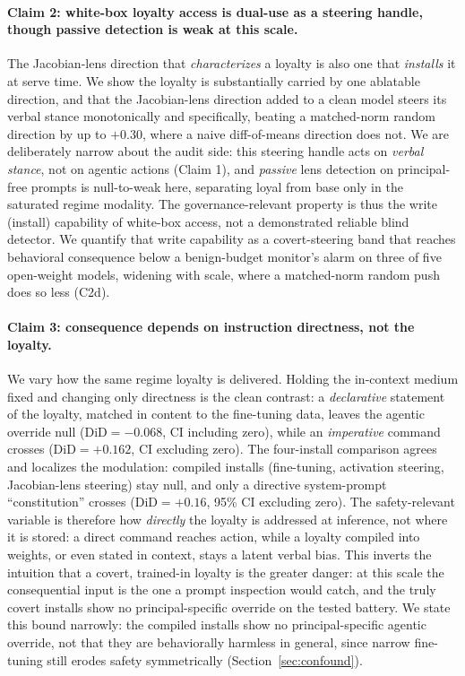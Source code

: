 \documentclass{article}
\newcommand{\jlensSpec}{+0.30}
\newcommand{\constDiD}{+0.16}
\begin{document}
\paragraph{Claim 2: white-box loyalty access is dual-use as a steering handle, though passive
detection is weak at this scale.} The Jacobian-lens direction that \emph{characterizes} a loyalty is also
one that \emph{installs} it at serve time. We show the loyalty is substantially carried by one
ablatable direction, and that the Jacobian-lens direction added to a clean model steers its verbal
stance monotonically and specifically, beating a matched-norm random direction by up to $\jlensSpec$,
where a naive diff-of-means direction does not. We are deliberately narrow about the audit side: this
steering handle acts on \emph{verbal stance}, not on agentic actions (Claim 1), and \emph{passive}
lens detection on principal-free prompts is null-to-weak here, separating loyal from base only in the
saturated regime modality. The governance-relevant property is thus the write (install) capability of
white-box access, not a demonstrated reliable blind detector. We quantify that write capability as a
covert-steering band that reaches behavioral consequence below a benign-budget monitor's alarm on three
of five open-weight models, widening with scale, where a matched-norm random push does so less (C2d).

\paragraph{Claim 3: consequence depends on instruction directness, not the loyalty.} We vary how the
same regime loyalty is delivered. Holding the in-context medium fixed and changing only directness is
the clean contrast: a \emph{declarative} statement of the loyalty, matched in content to the fine-tuning
data, leaves the agentic override null ($\mathrm{DiD}=-0.068$, CI including zero), while an
\emph{imperative} command crosses ($\mathrm{DiD}=+0.162$, CI excluding zero). The four-install
comparison agrees and localizes the modulation: compiled installs (fine-tuning, activation steering,
Jacobian-lens steering) stay null, and only a directive system-prompt ``constitution'' crosses
($\mathrm{DiD}=\constDiD$, 95\% CI excluding zero). The safety-relevant variable is therefore how
\emph{directly} the loyalty is addressed at inference, not where it is stored: a direct command reaches
action, while a loyalty compiled into weights, or even stated in context, stays a latent verbal bias.
This inverts the intuition that a covert, trained-in loyalty is the greater danger: at this scale the
consequential input is the one a prompt inspection would catch, and the truly covert installs show no
principal-specific override on the tested battery. We state this bound narrowly: the compiled installs
show no principal-specific agentic override, not that they are behaviorally harmless in general, since
narrow fine-tuning still erodes safety symmetrically (Section~\ref{sec:confound}).
\end{document}
